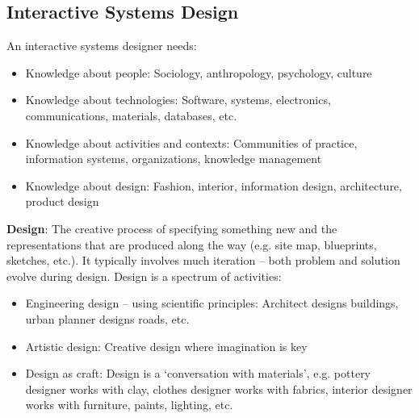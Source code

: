 \subsection{Interactive Systems Design}
An interactive systems designer needs: 
\begin{itemize}
\item Knowledge about people: Sociology, anthropology, psychology, culture
\item Knowledge about technologies: Software, systems, electronics, communications, materials, databases, etc.
\item Knowledge about activities and contexts: Communities of practice, information systems, organizations, knowledge management
\item Knowledge about design: Fashion, interior, information design, architecture, product design
\end{itemize}
\textbf{Design}: The creative process of specifying something new and the representations that are produced along the way (e.g. site map, blueprints, sketches, etc.). It typically involves much iteration -- both problem and solution evolve during design. Design is a spectrum of activities:
\begin{itemize}
\item Engineering design -- using scientific principles: Architect designs buildings, urban planner designs roads, etc.
\item Artistic design: Creative design where imagination is key
\item Design as craft: Design is a `conversation with materials',  e.g. pottery designer works with clay, clothes designer works with fabrics, interior designer works with furniture, paints, lighting, etc.
\end{itemize}

